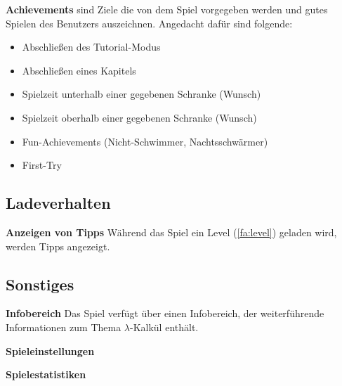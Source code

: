 \documentclass{scrartcl}
\begin{document}
\begin{falist}[resume]
    \item \label{fa:achievements} \textbf{Achievements} sind Ziele die von dem Spiel vorgegeben werden und gutes Spielen des Benutzers auszeichnen. Angedacht dafür sind folgende:
    \begin{itemize}
    	\item Abschließen des Tutorial-Modus
    	\item Abschließen eines Kapitels
    	\item Spielzeit unterhalb einer gegebenen Schranke (Wunsch)
    	\item Spielzeit oberhalb einer gegebenen Schranke (Wunsch)
    	\item Fun-Achievements (Nicht-Schwimmer, Nachtsschwärmer)
    	\item First-Try
    \end{itemize}
\end{falist}

\subsection{Ladeverhalten}

\begin{falist}[resume]
	\item \label{fa:tipps} \textbf{Anzeigen von Tipps} Während das Spiel ein Level (\ref{fa:level}) geladen wird, werden Tipps angezeigt.
\end{falist}

\subsection{Sonstiges}

\begin{falist}[resume]
	\item \label{fa:infobereich} \textbf{Infobereich} Das Spiel verfügt über einen Infobereich, der weiterführende Informationen zum Thema $\lambda$-Kalkül enthält.
	\item \label{fa:spieleinstellungen} \textbf{Spieleinstellungen}
	\item \label{fa:spielestatistiken} \textbf{Spielestatistiken}
	
\end{falist}

\clearpage








\end{document}
